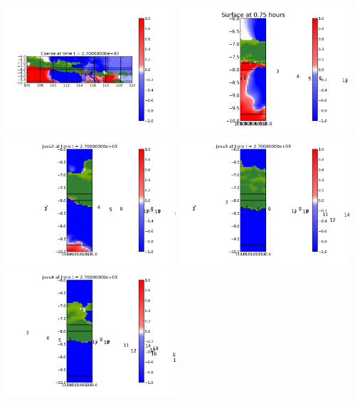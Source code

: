 \documentclass[11pt]{article}
\begin{document}
\vskip 10pt 
\includegraphics[width=0.475\textwidth]{frame0003fig0.png}
\includegraphics[width=0.475\textwidth]{frame0003fig15.png}
\vskip 10pt 
\includegraphics[width=0.475\textwidth]{frame0003fig25.png}
\includegraphics[width=0.475\textwidth]{frame0003fig20.png}
\vskip 10pt 
\includegraphics[width=0.475\textwidth]{frame0003fig30.png}
\end{document}
